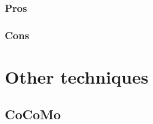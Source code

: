 \subsubsection{Pros}

\subsubsection{Cons}

\section{Other techniques}
\subsection{CoCoMo}



















